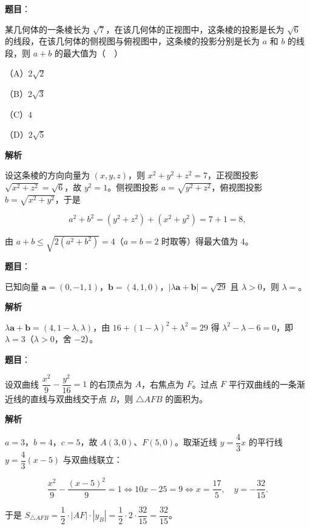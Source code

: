 \begin{answer}

\textbf{题目}：

某几何体的一条棱长为 $\sqrt7$，在该几何体的正视图中，这条棱的投影是长为 $\sqrt6$ 的线段，在该几何体的侧视图与俯视图中，这条棱的投影分别是长为 $a$ 和 $b$ 的线段，则 $a+b$ 的最大值为（　）

（A）$2\sqrt2$

（B）$2\sqrt3$

（C）$4$

（D）$2\sqrt5$

\textbf{解析}

设这条棱的方向向量为 $(x,y,z)$，则 $x^2+y^2+z^2=7$，正视图投影 $\sqrt{x^2+z^2}=\sqrt6$，故 $y^2=1$。侧视图投影 $a=\sqrt{y^2+z^2}$，俯视图投影 $b=\sqrt{x^2+y^2}$，于是

\nopagebreak[4]
\[a^2+b^2=(y^2+z^2)+(x^2+y^2)=7+1=8,\]

由 $a+b\leqslant\sqrt{2(a^2+b^2)}=4$（$a=b=2$ 时取等）得最大值为 $4$。


\end{answer}
\begin{answer}

\textbf{题目}：

已知向量 $\boldsymbol a=(0,-1,1)$，$\boldsymbol b=(4,1,0)$，$|\lambda\boldsymbol a+\boldsymbol b|=\sqrt{29}$ 且 $\lambda>0$，则 $\lambda=$\gkblank{}。

\textbf{解析}

$\lambda\boldsymbol a+\boldsymbol b=(4,1-\lambda,\lambda)$，由 $16+(1-\lambda)^2+\lambda^2=29$ 得 $\lambda^2-\lambda-6=0$，即 $\lambda=3$（$\lambda>0$，舍 $-2$）。


\end{answer}
\begin{answer}

\textbf{题目}：

设双曲线 $\dfrac{x^2}9-\dfrac{y^2}{16}=1$ 的右顶点为 $A$，右焦点为 $F$。过点 $F$ 平行双曲线的一条渐近线的直线与双曲线交于点 $B$，则 $\triangle AFB$ 的面积为\gkblank{}。

\textbf{解析}

$a=3$，$b=4$，$c=5$，故 $A(3,0)$、$F(5,0)$。取渐近线 $y=\dfrac43x$ 的平行线 $y=\dfrac43(x-5)$ 与双曲线联立：

\nopagebreak[4]
\[\frac{x^2}9-\frac{(x-5)^2}9=1\iff10x-25=9\iff x=\frac{17}5,\quad y=-\frac{32}{15}.\]

于是 $S_{\triangle AFB}=\dfrac12\cdot|AF|\cdot|y_B|=\dfrac12\cdot2\cdot\dfrac{32}{15}=\dfrac{32}{15}$。


\end{answer}
